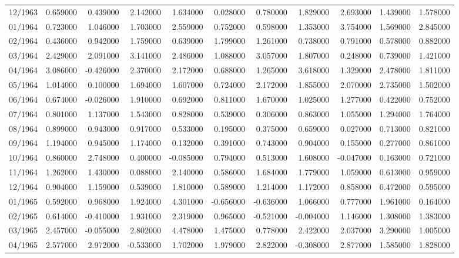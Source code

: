 \begin{tabular}{lrrrrrrrrrr}
12/1963 & 0.659000 & 0.439000 & 2.142000 & 1.634000 & 0.028000 & 0.780000 & 1.829000 & 2.693000 & 1.439000 & 1.578000 \\
01/1964 & 0.723000 & 1.046000 & 1.703000 & 2.559000 & 0.752000 & 0.598000 & 1.353000 & 3.754000 & 1.569000 & 2.845000 \\
02/1964 & 0.436000 & 0.942000 & 1.759000 & 0.639000 & 1.799000 & 1.261000 & 0.738000 & 0.791000 & 0.578000 & 0.882000 \\
03/1964 & 2.429000 & 2.091000 & 3.141000 & 2.486000 & 1.088000 & 3.057000 & 1.807000 & 0.248000 & 0.739000 & 1.421000 \\
04/1964 & 3.086000 & -0.426000 & 2.370000 & 2.172000 & 0.688000 & 1.265000 & 3.618000 & 1.329000 & 2.478000 & 1.811000 \\
05/1964 & 1.014000 & 0.100000 & 1.694000 & 1.607000 & 0.724000 & 2.172000 & 1.855000 & 2.070000 & 2.735000 & 1.502000 \\
06/1964 & 0.674000 & -0.026000 & 1.910000 & 0.692000 & 0.811000 & 1.670000 & 1.025000 & 1.277000 & 0.422000 & 0.752000 \\
07/1964 & 0.801000 & 1.137000 & 1.543000 & 0.828000 & 0.539000 & 0.306000 & 0.863000 & 1.055000 & 1.294000 & 1.764000 \\
08/1964 & 0.899000 & 0.943000 & 0.917000 & 0.533000 & 0.195000 & 0.375000 & 0.659000 & 0.027000 & 0.713000 & 0.821000 \\
09/1964 & 1.194000 & 0.945000 & 1.174000 & 0.132000 & 0.391000 & 0.743000 & 0.904000 & 0.155000 & 0.277000 & 0.861000 \\
10/1964 & 0.860000 & 2.748000 & 0.400000 & -0.085000 & 0.794000 & 0.513000 & 1.608000 & -0.047000 & 0.163000 & 0.721000 \\
11/1964 & 1.262000 & 1.430000 & 0.088000 & 2.140000 & 0.586000 & 1.684000 & 1.779000 & 1.059000 & 0.613000 & 0.959000 \\
12/1964 & 0.904000 & 1.159000 & 0.539000 & 1.810000 & 0.589000 & 1.214000 & 1.172000 & 0.858000 & 0.472000 & 0.595000 \\
01/1965 & 0.592000 & 0.968000 & 1.924000 & 4.301000 & -0.656000 & -0.636000 & 1.066000 & 0.777000 & 1.961000 & 0.164000 \\
02/1965 & 0.614000 & -0.410000 & 1.931000 & 2.319000 & 0.965000 & -0.521000 & -0.004000 & 1.146000 & 1.308000 & 1.383000 \\
03/1965 & 2.457000 & -0.055000 & 2.802000 & 4.478000 & 1.475000 & 0.778000 & 2.422000 & 2.037000 & 3.290000 & 1.005000 \\
04/1965 & 2.577000 & 2.972000 & -0.533000 & 1.702000 & 1.979000 & 2.822000 & -0.308000 & 2.877000 & 1.585000 & 1.828000 \\

\end{tabular}
